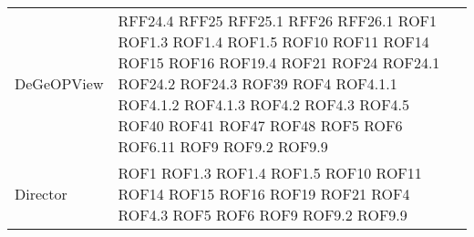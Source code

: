 \begin{longtable}{p{5cm}!{\VRule[1pt]}p{2.5cm}}
		DeGeOPView & RFF24.4 \newline RFF25 \newline RFF25.1 \newline RFF26 \newline RFF26.1 \newline ROF1 \newline ROF1.3 \newline ROF1.4 \newline ROF1.5 \newline ROF10 \newline ROF11 \newline ROF14 \newline ROF15 \newline ROF16 \newline ROF19.4 \newline ROF21 \newline ROF24 \newline ROF24.1 \newline ROF24.2 \newline ROF24.3 \newline ROF39 \newline ROF4 \newline ROF4.1.1 \newline ROF4.1.2 \newline ROF4.1.3 \newline ROF4.2 \newline ROF4.3 \newline ROF4.5 \newline ROF40 \newline ROF41 \newline ROF47 \newline ROF48 \newline ROF5 \newline ROF6 \newline ROF6.11 \newline ROF9 \newline ROF9.2 \newline ROF9.9\\
		Director & ROF1 \newline ROF1.3 \newline ROF1.4 \newline ROF1.5 \newline ROF10 \newline ROF11 \newline ROF14 \newline ROF15 \newline ROF16 \newline ROF19 \newline ROF21 \newline ROF4 \newline ROF4.3 \newline ROF5 \newline ROF6 \newline ROF9 \newline ROF9.2 \newline ROF9.9\\

\end{longtable}
